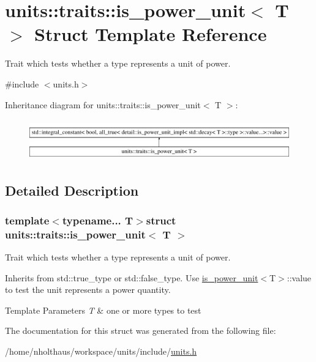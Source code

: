 \hypertarget{structunits_1_1traits_1_1is__power__unit}{}\section{units\+:\+:traits\+:\+:is\+\_\+power\+\_\+unit$<$ T $>$ Struct Template Reference}
\label{structunits_1_1traits_1_1is__power__unit}


Trait which tests whether a type represents a unit of power.  




{\ttfamily \#include $<$units.\+h$>$}

Inheritance diagram for units\+:\+:traits\+:\+:is\+\_\+power\+\_\+unit$<$ T $>$\+:\begin{figure}[H]
\begin{center}
\leavevmode
\includegraphics[height=1.786284cm]{structunits_1_1traits_1_1is__power__unit}
\end{center}
\end{figure}


\subsection{Detailed Description}
\subsubsection*{template$<$typename... T$>$struct units\+::traits\+::is\+\_\+power\+\_\+unit$<$ T $>$}

Trait which tests whether a type represents a unit of power. 

Inherits from {\ttfamily std\+::true\+\_\+type} or {\ttfamily std\+::false\+\_\+type}. Use {\ttfamily \hyperlink{structunits_1_1traits_1_1is__power__unit}{is\+\_\+power\+\_\+unit}$<$T$>$\+::value} to test the unit represents a power quantity. 
\begin{DoxyTemplParams}{Template Parameters}
{\em T} & one or more types to test \\
\hline
\end{DoxyTemplParams}


The documentation for this struct was generated from the following file\+:\begin{DoxyCompactItemize}
\item 
/home/nholthaus/workspace/units/include/\hyperlink{units_8h}{units.\+h}\end{DoxyCompactItemize}
